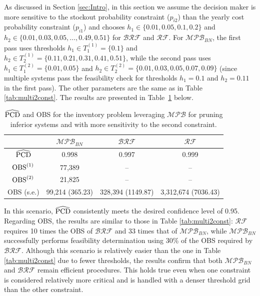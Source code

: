 \documentclass[11pt]{article}
\begin{document}
As discussed in Section \ref{sec:Intro}, in this section we assume the decision maker is more sensitive to the stockout probability constraint ($p_{i2}$) than the yearly cost probability constraint ($p_{i1}$) and chooses $h_1 \in \{0.01, 0.05, 0.1, 0.2\}$ and $h_2\in\{0.01, 0.03, 0.05, \ldots, 0.49, 0.51\}$ for $\mathcal{BRF}$ and $\mathcal{RF}$. For $\mathcal{MPB}_{BN}$,  the first pass uses thresholds $h_{1} \in T_1^{(1)} = \{0.1\}$ and $h_{2} \in T_2^{(1)} = \{0.11, 0.21, 0.31, 0.41, 0.51\}$, while the second pass uses $h_{1} \in T_1^{(2)}= \{0.01, 0.05\}$ and $h_{2} \in T_2^{(2)}=\{0.01, 0.03, 0.05, 0.07, 0.09\}$ (since multiple systems pass the feasibility check for thresholds $h_1=0.1$ and $h_2=0.11$ in the first pass). The other parameters are the same as in Table \ref{tab:multi2const}. The results are presented in Table~\ref{tab:multi2constsensitive} below.
\begin{table}[h!] 
\centering
\renewcommand{\arraystretch}{0.8}
\caption{$\widehat{{\rm PCD}}$ and OBS for the inventory problem leveraging $\mathcal{MPB}$ for pruning inferior systems and with more sensitivity to the second constraint.}
\label{tab:multi2constsensitive}
{\normalsize
\begin{tabular}{c|ccc}
\toprule
    & $\mathcal{MPB}_{BN}$ & $\mathcal{BRF}$ & $\mathcal{RF}$      \\ \midrule
$\widehat{{\rm PCD}}$ &  0.998  &  0.997  & 0.999 \\ \hline
${\rm OBS}^{(1)}$ & 77,389 & -- & -- \\ \hline
${\rm OBS}^{(2)}$ & 21,825 & -- & -- \\ \hline
OBS (s.e.) & 99,214 (365.23) & 328,394 (1149.87) & 3,312,674 (7036.43) \\ \bottomrule
\end{tabular}
}
\end{table}

In this scenario, $\widehat{{\rm PCD}}$ consistently meets the desired confidence level of 0.95. Regarding OBS, the results are similar to those in Table \ref{tab:multi2const}: $\mathcal{RF}$ requires 10 times the OBS of $\mathcal{BRF}$ and 33 times that of $\mathcal{MPB}_{BN}$, while $\mathcal{MPB}_{BN}$ successfully performs feasibility determination using 30\% of the OBS required by $\mathcal{BRF}$. Although this scenario is relatively easier than the one in Table \ref{tab:multi2const} due to fewer thresholds, the results confirm that both $\mathcal{MPB}_{BN}$ and $\mathcal{BRF}$ remain efficient procedures. This holds true even when one constraint is considered relatively more critical and is handled with a denser threshold grid than the other constraint. 
\end{document}
